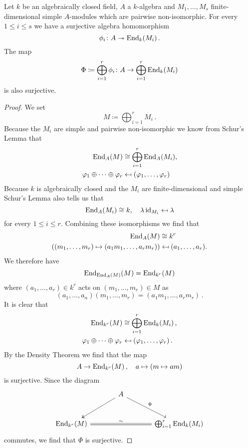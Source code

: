 \begin{lemma}\label{lemma: map into sum endomorphisms surjective}
  Let $k$ be an algebraically closed field, $A$ a $k$-algebra and $M_1, \dotsc, M_s$ finite-dimensional simple $A$-modules which are pairwise non-isomorphic.
  For every $1 \leq i \leq s$ we have a surjective algebra homomorphism
  \[
                        \phi_i
    \colon              A
    \twoheadrightarrow  \operatorname{End}_k(M_i) \,.
  \]
  The map
  \[
              \Phi
    \coloneqq \bigoplus_{i=1}^r \phi_i
    \colon    A
    \to       \bigoplus_{i=1}^r \operatorname{End}_k(M_i)
  \]
  is also surjective.
\end{lemma}
\begin{proof}
  We set
  \[
    M \coloneqq \bigoplus_{i=1}^r M_i \,.
  \]
  Because the $M_i$ are simple and pairwise non-isomorphic we know from Schur’s Lemma that
  \begin{align*}
                \operatorname{End}_A(M)
    &\cong      \bigoplus_{i=1}^r \operatorname{End}_A(M_i), \\
                \varphi_1 \oplus \dotsb \oplus \varphi_r
    &\mapsfrom  (\varphi_1, \dotsc, \varphi_r)
  \end{align*}
  Because $k$ is algebraically closed and the $M_i$ are finite-dimensional and simple Schur’s Lemma also tells us that
  \[
              \operatorname{End}_A(M_i)
    \cong     k,
    \quad     \lambda \operatorname{id}_{M_i}
    \mapsfrom \lambda
  \]
  for every $1 \leq i \leq r$.
  Combining these isomorphisms we find that
  \begin{align*}
                \operatorname{End}_A(M)
    &\cong      k^r \\
                (
                          (m_1, \dotsc, m_r)
                  \mapsto (a_1 m_1, \dotsc, a_r m_r)
                )
    &\mapsfrom  (a_1, \dotsc, a_r).
  \end{align*}
  We therefore have
  \[
      \operatorname{End}_{\operatorname{End}_A(M)}(M)
    = \operatorname{End}_{k^r}(M)
  \]
  where $(a_1, \dotsc, a_r) \in k^r$ acts on $(m_1, \dotsc, m_r) \in M$ as
  \[
      (a_1, \dotsc, a_n)(m_1, \dotsc, m_r)
    = (a_1 m_1, \dotsc, a_r m_r) \,.
  \]
  It is clear that
  \begin{align*}
                \operatorname{End}_{k^r}(M)
    &\cong      \bigoplus_{i=1}^r \operatorname{End}_k(M_i) \,, \\
                \varphi_1 \oplus \dotsb \oplus \varphi_r
    &\mapsfrom  (\varphi_1, \dotsc, \varphi_r) \,.
  \end{align*}
  By the Density Theorem we find that the map
  \[
            A
    \to     \operatorname{End}_{k^r}(M) \,,
    \quad   a
    \mapsto (m \mapsto am)
  \]
  is surjective.
  Since the diagram
  \[
    \begin{tikzcd}[sep = large]
        {}
      & A
        \arrow[two heads]{dl}
        \arrow{dr}{\Phi}
      & {}
      \\
        \End_{k^r}(M)
        \arrow[equal]{rr}{\sim}
      & {}
      & \bigoplus_{i=1}^r \End_k(M_i)
    \end{tikzcd}
  \]
  commutes, we find that $\Phi$ is surjective.
\end{proof}


